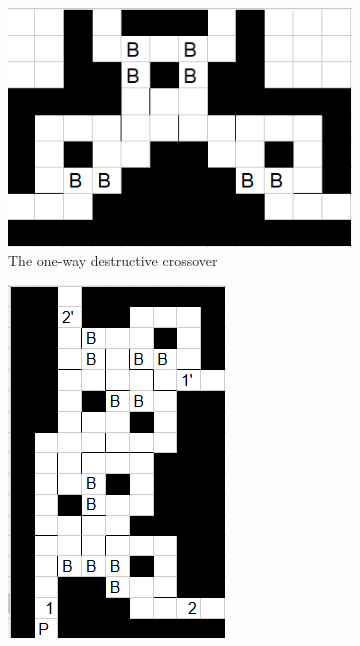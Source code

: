 \documentclass[11pt]{article}
\begin{document}
\begin{figure}[!ht]
  \centering
  \caption{Two types of crossover gadgets}
  \begin{subfigure}[b]{0.55\textwidth}
    \includegraphics[width=\textwidth]{one_time_crossover}
    \caption{The one-way destructive crossover}
    \label{ldeCoeffs}
  \end{subfigure}
  \hfill
  \begin{subfigure}[b]{0.35\textwidth}
    \includegraphics[width=\textwidth]{destructive_crossover}

\end{subfigure}
\end{figure}
\end{document}
